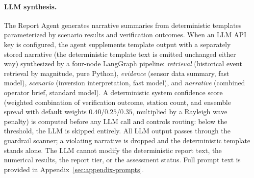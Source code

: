 \documentclass{article}
\begin{document}
\paragraph{LLM synthesis.}
The Report Agent generates narrative summaries from deterministic
templates parameterized by scenario results and verification outcomes.
When an LLM API key is configured, the agent supplements template output
with a separately stored narrative (the deterministic template text is
emitted unchanged either way) synthesized by a four-node LangGraph pipeline:
\emph{retrieval} (historical event retrieval by magnitude, pure Python),
\emph{evidence} (sensor data summary, fast model),
\emph{scenario} (inversion interpretation, fast model), and
\emph{narrative} (combined operator brief, standard model).
A deterministic system confidence score (weighted combination of
verification outcome, station count, and ensemble spread with default
weights $0.40$/$0.25$/$0.35$, multiplied by a Rayleigh wave penalty)
is computed before any LLM call and controls routing:
below the threshold, the LLM is skipped entirely. All LLM output
passes through the guardrail scanner; a violating narrative is
dropped and the deterministic template stands alone. The LLM cannot modify the deterministic report text, the numerical
results, the report tier, or the assessment status. Full prompt text is provided in
Appendix~\ref{sec:appendix-prompts}.
\end{document}
